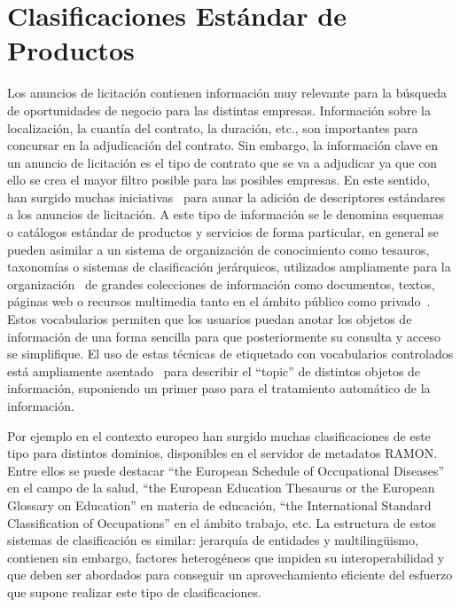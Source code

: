 \section{Clasificaciones Estándar de Productos}\label{sect:pscs}
Los anuncios de licitación contienen información muy relevante para la búsqueda
de oportunidades de negocio para las distintas empresas. Información sobre la localización,
la cuantía del contrato, la duración, etc., son importantes para concursar
en la adjudicación del contrato. Sin embargo, la información clave en un anuncio
de licitación es el tipo de contrato que se va a adjudicar ya que con ello
se crea el mayor filtro posible para las posibles empresas. En este sentido,
han surgido muchas iniciativas~\cite{Leukel-findings} para aunar la adición de descriptores estándares~\cite{Leukel-standard}
a los anuncios de licitación. A este tipo de información se le denomina
esquemas o catálogos estándar de productos y servicios de forma particular, en general se pueden asimilar 
a un sistema de organización de conocimiento como tesauros, taxonomías o sistemas de clasificación jerárquicos, utilizados
ampliamente para la organización~\cite{Leukel-automating} de grandes colecciones de información como 
documentos, textos, páginas web o recursos multimedia tanto en el ámbito público como privado~\cite{Leukel-comparative}. Estos vocabularios
permiten que los usuarios puedan anotar los objetos de información de una forma
sencilla para que posteriormente su consulta y acceso se simplifique. El uso
de estas técnicas de etiquetado con vocabularios controlados está ampliamente
asentado~\cite{Leukel-ecatalog2005} para describir el ``topic'' de distintos objetos de información, 
suponiendo un primer paso para el tratamiento automático de la información.

Por ejemplo en el contexto europeo han surgido muchas clasificaciones de este tipo
para distintos dominios, disponibles en el servidor de metadatos \gls{RAMON}.
Entre ellos se puede destacar ``the European Schedule of Occupational Diseases'' en el 
campo de la salud, ``the European Education Thesaurus or the European Glossary on Education''
en materia de educación, ``the International Standard Classification of Occupations'' en el ámbito trabajo, etc.
La estructura de estos sistemas de clasificación es similar: jerarquía de entidades y multiling\"{u}ismo, contienen sin embargo, 
factores heterogéneos que impiden su interoperabilidad y que deben ser abordados para conseguir un aprovechamiento eficiente del esfuerzo que supone realizar este tipo
de clasificaciones.

